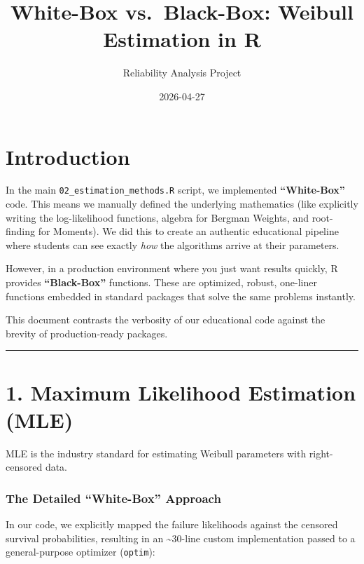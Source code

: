 \documentclass[
]{article}
\title{White-Box vs.~Black-Box: Weibull Estimation in R}
\author{Reliability Analysis Project}
\date{2026-04-27}
\begin{document}
\maketitle

{
\setcounter{tocdepth}{2}
\tableofcontents
}
\section{Introduction}\label{introduction}

In the main \texttt{02\_estimation\_methods.R} script, we implemented
\textbf{``White-Box''} code. This means we manually defined the
underlying mathematics (like explicitly writing the log-likelihood
functions, algebra for Bergman Weights, and root-finding for Moments).
We did this to create an authentic educational pipeline where students
can see exactly \emph{how} the algorithms arrive at their parameters.

However, in a production environment where you just want results
quickly, R provides \textbf{``Black-Box''} functions. These are
optimized, robust, one-liner functions embedded in standard packages
that solve the same problems instantly.

This document contrasts the verbosity of our educational code against
the brevity of production-ready packages.

\begin{center}\rule{0.5\linewidth}{0.5pt}\end{center}

\section{1. Maximum Likelihood Estimation
(MLE)}\label{maximum-likelihood-estimation-mle}

MLE is the industry standard for estimating Weibull parameters with
right-censored data.

\subsubsection{The Detailed ``White-Box''
Approach}\label{the-detailed-white-box-approach}

In our code, we explicitly mapped the failure likelihoods against the
censored survival probabilities, resulting in an \textasciitilde30-line
custom implementation passed to a general-purpose optimizer
(\texttt{optim}):
\end{document}
